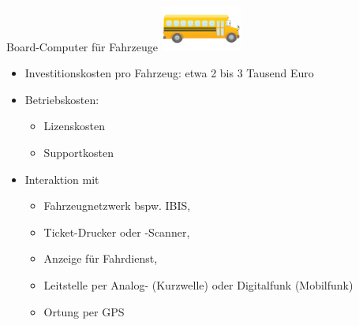 
\begin{frame}{Board-Computer für Fahrzeuge}
  \includegraphics[width=0.2\textwidth]{otm-june-2-2021/bus.png}
  \begin{itemize}
  \item Investitionskosten pro Fahrzeug: etwa 2 bis 3 Tausend Euro
  \item Betriebskosten:
    \begin{itemize}
    \item Lizenskosten
    \item Supportkosten
    \end{itemize}
  \item Interaktion mit
    \begin{itemize}
    \item Fahrzeugnetzwerk bspw. IBIS,
    \item Ticket-Drucker oder -Scanner,
    \item Anzeige für Fahrdienst,
    \item Leitstelle per Analog- (Kurzwelle) oder Digitalfunk (Mobilfunk)
    \item Ortung per GPS
    \end{itemize}
  \end{itemize}
\end{frame}

